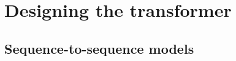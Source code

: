
\def\tokdx{0.85}
\def\tokyo{2.3}
\newcommand{\panelrows}[2]{%
    \foreach \i in {0,...,4} {
            \node[tok] (o#1\i) at ({#2+\i*\tokdx},\tokyo) {};
            \node[tok] (i#1\i) at ({#2+\i*\tokdx},0) {};
        }
    \node[outtok] at (o#12) {};
    \node[gtok] at (i#11) {};
    \node[btok] at (i#14) {};
    \node[vlab, above=1pt] at (o#12.north) {$\vc{h}_t$};
    \node[vlab, below=1pt, drawgreen!70!black] at (i#11.south) {$\vc{x}_{t-1}$};
    \node[vlab, below=1pt, drawblue!80!black] at (i#14.south) {$\vc{x}_{t+2}$};
}



\section{Designing the transformer}
\subsection{Sequence-to-sequence models}

